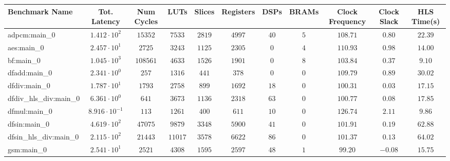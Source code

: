 \begin{tabular}{|l|c|c|c|c|c|c|c|c|c|c|}
\hline
Benchmark Name          & Tot. Latency            & Num Cycles & LUTs      & Slices    & Registers & DSPs    & BRAMs  & Clock Frequency & Clock Slack & HLS Time(s) \\
\hline
adpcm:main\_0           & $ 1.412 \cdot 10^{2}  $ & $ 15352  $ & $ 7533  $ & $ 2819  $ & $ 4997  $ & $ 40  $ & $ 5  $ & $ 108.71      $ & $ 0.80    $ & $ 22.39   $ \\
aes:main\_0             & $ 2.457 \cdot 10^{1}  $ & $ 2725   $ & $ 3243  $ & $ 1125  $ & $ 2305  $ & $ 0   $ & $ 4  $ & $ 110.93      $ & $ 0.98    $ & $ 14.00   $ \\
bf:main\_0              & $ 1.045 \cdot 10^{3}  $ & $ 108561 $ & $ 4633  $ & $ 1526  $ & $ 1901  $ & $ 0   $ & $ 8  $ & $ 103.84      $ & $ 0.37    $ & $ 9.10    $ \\
dfadd:main\_0           & $ 2.341 \cdot 10^{0}  $ & $ 257    $ & $ 1316  $ & $ 441   $ & $ 378   $ & $ 0   $ & $ 0  $ & $ 109.79      $ & $ 0.89    $ & $ 30.02   $ \\
dfdiv:main\_0           & $ 1.787 \cdot 10^{1}  $ & $ 1793   $ & $ 2758  $ & $ 899   $ & $ 1692  $ & $ 18  $ & $ 0  $ & $ 100.31      $ & $ 0.03    $ & $ 17.15   $ \\
dfdiv\_hls\_div:main\_0 & $ 6.361 \cdot 10^{0}  $ & $ 641    $ & $ 3673  $ & $ 1136  $ & $ 2318  $ & $ 63  $ & $ 0  $ & $ 100.77      $ & $ 0.08    $ & $ 17.85   $ \\
dfmul:main\_0           & $ 8.916 \cdot 10^{-1} $ & $ 113    $ & $ 1261  $ & $ 400   $ & $ 611   $ & $ 10  $ & $ 0  $ & $ 126.74      $ & $ 2.11    $ & $ 9.86    $ \\
dfsin:main\_0           & $ 4.619 \cdot 10^{2}  $ & $ 47075  $ & $ 9879  $ & $ 3348  $ & $ 5900  $ & $ 41  $ & $ 0  $ & $ 101.91      $ & $ 0.19    $ & $ 62.88   $ \\
dfsin\_hls\_div:main\_0 & $ 2.115 \cdot 10^{2}  $ & $ 21443  $ & $ 11017 $ & $ 3578  $ & $ 6622  $ & $ 86  $ & $ 0  $ & $ 101.37      $ & $ 0.13    $ & $ 64.02   $ \\
gsm:main\_0             & $ 2.541 \cdot 10^{1}  $ & $ 2521   $ & $ 4308  $ & $ 1595  $ & $ 2597  $ & $ 48  $ & $ 1  $ & $ 99.20       $ & $ -0.08   $ & $ 15.75   $ \\

\end{tabular}
